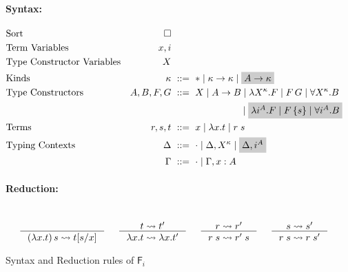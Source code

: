 \documentclass{llncs}
\newcommand{\newFi}[1]{\colorbox{grey}{\ensuremath{#1}}}
\newcommand{\Fi}{\ensuremath{\mathsf{F}_i}}
\begin{document}
\begin{figure}
\paragraph{Syntax:}
\begin{align*}
\!\!\!\!\!\!\!\!&\text{Sort}
 	& \square
	\\
\!\!\!\!\!\!\!\!&\text{Term Variables}
 	& x,i
\\
\!\!\!\!\!\!\!\!&\text{Type Constructor Variables}
 	& X
\\
\!\!\!\!\!\!\!\!&\text{Kinds}
 	& \kappa		&~ ::= ~ *
				\mid \kappa -> \kappa
				\mid \newFi{A -> \kappa}
\\
\!\!\!\!\!\!\!\!&\text{Type Constructors}
	& A,B,F,G		&~ ::= ~ X
				\mid A -> B
				\mid \lambda X^\kappa.F
				\mid F\,G
				\mid \forall X^\kappa . B \\
				&&& \qquad\qquad\qquad\quad~
				\mid \newFi{\lambda i^A.F
				\mid F\,\{s\}
				\mid \forall i^A . B}
\\
\!\!\!\!\!\!\!\!&\text{Terms}
	& r,s,t			&~ ::= ~ x \mid \lambda x.t \mid r\;s
\\
\!\!\!\!\!\!\!\!&\text{Typing Contexts}
	& \Delta		&~ ::= ~ \cdot
				\mid \Delta, X^\kappa
				\mid \newFi{\Delta, i^A} \\
&	& \Gamma		&~ ::= ~ \cdot
				\mid \Gamma, x : A
\end{align*}
\paragraph{Reduction:} ~~  \\
$
 ~~~~
   \inference{}{(\lambda x.t)\,s \rightsquigarrow t[s/x]}
 ~~~~
   \inference{t \rightsquigarrow t'}{\lambda x.t \rightsquigarrow \lambda x.t'}
 ~~~~
   \inference{r \rightsquigarrow r'}{r\;s \rightsquigarrow r'\;s}
 ~~~~
   \inference{s \rightsquigarrow s'}{r\;s \rightsquigarrow r\;s'}
$
\caption{Syntax and Reduction rules of \Fi}
\label{fig:FiSyntax}
\end{figure}
\end{document}
